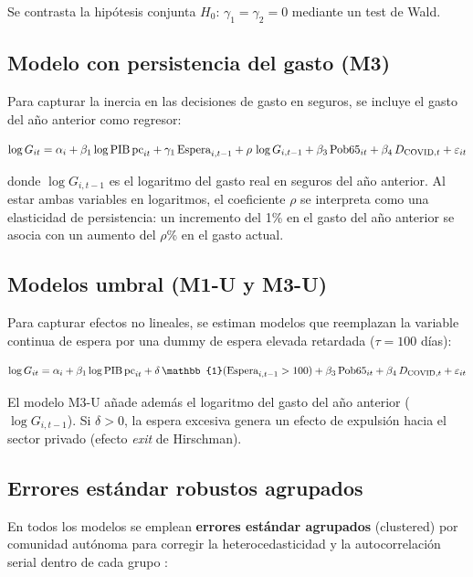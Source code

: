 Se contrasta la hipótesis conjunta $H_0$: $\gamma_1 = \gamma_2 = 0$ mediante un
test de Wald.

\subsection{Modelo con persistencia del gasto (M3)}

Para capturar la inercia en las decisiones de gasto en seguros, se incluye el
gasto del año anterior como regresor:

\begin{equation}
  \log G_{it} = \alpha_i + \beta_1 \log\text{PIB\,pc}_{it}
    + \gamma_1 \,\text{Espera}_{i,t-1}
    + \rho \, \log G_{i,t-1}
    + \beta_3 \,\text{Pob65}_{it}
    + \beta_4 \,D_{\text{COVID},t}
    + \varepsilon_{it}
  \label{eq:mod_persist}
\end{equation}

donde $\log G_{i,t-1}$ es el logaritmo del gasto real en seguros del año
anterior. Al estar ambas variables en logaritmos, el coeficiente $\rho$ se
interpreta como una elasticidad de persistencia: un incremento del 1\% en el
gasto del año anterior se asocia con un aumento del $\rho$\% en el gasto actual.

\subsection{Modelos umbral (M1-U y M3-U)}

Para capturar efectos no lineales, se estiman modelos que reemplazan la variable
continua de espera por una dummy de espera elevada retardada ($\tau = 100$ días):

\begin{equation}
  \log G_{it} = \alpha_i + \beta_1 \log\text{PIB\,pc}_{it}
    + \delta \,\mathbb{1}(\text{Espera}_{i,t-1} > 100)
    + \beta_3 \,\text{Pob65}_{it}
    + \beta_4 \,D_{\text{COVID},t}
    + \varepsilon_{it}
  \label{eq:mod_umbral}
\end{equation}

El modelo M3-U añade además el logaritmo del gasto del año anterior
($\log G_{i,t-1}$). Si $\delta > 0$, la espera excesiva genera un efecto de
expulsión hacia el sector privado (efecto \textit{exit} de Hirschman).
\subsection{Errores estándar robustos agrupados}

En todos los modelos se emplean \textbf{errores estándar agrupados} (clustered)
por comunidad autónoma para corregir la heterocedasticidad y la
autocorrelación serial dentro de cada grupo \parencite{Cameron2015}:

